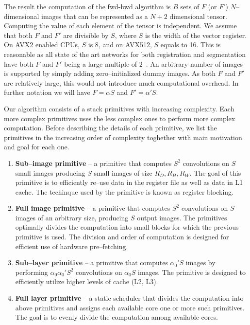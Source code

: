   The result the computation of the fwd-bwd algorithm is $B$ sets of
  $F$ (or $F'$) $N$--dimensional images that can be represented as a
  $N+2$ dimensional tensor.  Computing the value of each element of
  the tensor is independent.  We assume that both $F$ and $F'$ are
  divisible by $S$, where $S$ is the width of the vector register.  On
  AVX2 enabled CPUs, $S$ is 8, and on AVX512, $S$ equals to 16.  This
  is reasonable as all state of the art networks for both registration
  and segmentation have both $F$ and $F'$ being a large multiple of
  $2$~\cite{krizhevsky2012imagenet, ronneberger2015u,
    simonyan2014very, sermanet2013overfeat, long2015fully,
    tran2015learning, ji20133d, maturana_iros_2015,
    maturana_icra_2014}.  An arbitrary number of images is supported
  by simply adding zero--initialized dummy images.  As both $F$ and
  $F'$ are relatively large, this would not introduce much
  computational overhead.  In further notation we will have $F =
  \alpha S$ and $F' = \alpha' S$.

  Our algorithm consists of a stack primitives with increasing
  complexity.  Each more complex primitives uses the less complex ones
  to perform more complex computation.  Before describing the details
  of each primitive, we list the primitives in the increasing order of
  complexity toghether with main motivation and goal for each one.

  \begin{enumerate}
  \item {\bf Sub--image primitive} -- a primitive that computes $S^2$
    convolutions on $S$ small images producing $S$ small images of
    size $R_D, R_H, R_W$.  The goal of this primitive is to
    efficiently re--use data in the register file as well as data in
    L1 cache.  The techinque used by the primitive is known as
    register blocking.
  \item {\bf Full image primitive} -- a primitive that computes $S^2$
    convolutions on $S$ images of an arbitrary size, producing $S$
    output images.  The primitives optimally divides the computation
    into small blocks for which the previous primitive is used.  The
    division and order of computation is designed for efficient use of
    hardware pre--fetching.
  \item {\bf Sub--layer primitive} -- a primitive that computes
    $\alpha_0'S$ images by performing $\alpha_0 \alpha_0' S^2$
    convolutions on $\alpha_0 S$ images.  The primitive is designed to
    efficiently utilize higher levels of cache (L2, L3).
  \item {\bf Full layer primitive} -- a static scheduler that divides
    the computation into above primitives and assigns each available
    core one or more such primitives.  The goal is to evenly divide
    the computation among available cores.
  \end{enumerate}

